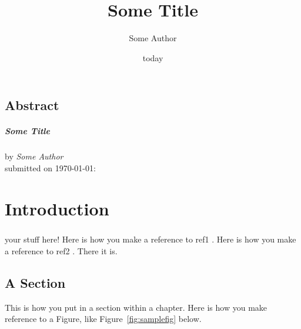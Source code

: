 \documentclass[12pt, oneside]{smuthesis}
\begin{document}
\frontmatter
\title{\sc Some Title}
\author{Some Author}
\date{today}
\medskip

\maketitle
\pagestyle{headings}

\begin{center}
\section*{\center \sc Abstract}
\paragraph*{\center \sc Some Title\\}
by {\em Some Author}\\
submitted on \today:\\
\end{center}
\newpage

\tableofcontents
\listoffigures
\listoftables
\newpage
%
\mainmatter
\chapter{\sc Introduction}
\paragraph*{}

your stuff here! Here is how you make a reference to ref1 \citep{test1}. Here is how you make a reference to ref2 \citep{test2}. There it is.

\citet{Abbate2018}

\section{\sc A Section}

This is how you put in a section within a chapter.
Here is how you make reference to a Figure, like Figure~\ref{fig:samplefig}
 below.
\end{document}
